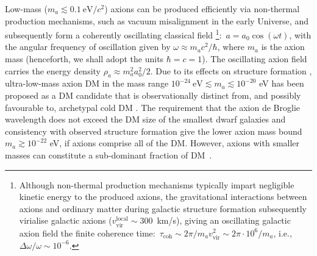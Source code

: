 Low-mass ($m_a \lesssim 0.1~\textrm{eV}/c^2$) axions can be produced efficiently via non-thermal production mechanisms, such as vacuum misalignment \cite{Preskill1983cosmo,Sikivie1983cosmo,Dine1983cosmo} in the early Universe, and subsequently form a coherently oscillating classical field \footnote{Although non-thermal production mechanisms typically impart negligible kinetic energy to the produced axions, the gravitational interactions between axions and ordinary matter during galactic structure formation subsequently virialise galactic axions ($v_{\textrm{vir}}^{\textrm{local}} \sim 300$~km/s), giving an oscillating galactic axion field the finite coherence time:~$\tau_{\textrm{coh}} \sim 2\pi / m_a v_{\textrm{vir}}^2 \sim 2\pi \cdot 10^6 / m_a $, i.e., $\Delta \omega / \omega \sim 10^{-6}$. }:~$a = a_0 \cos(\omega t)$, with the angular frequency of oscillation given by $\omega \approx m_a c^2 / \hbar$, where $m_a$ is the axion mass (henceforth, we shall adopt the units $\hbar = c = 1$).
The oscillating axion field carries the energy density $\rho_a \approx m_a^2 a_0^2 /2$. Due to its effects on structure formation \cite{Khlopov1985}, ultra-low-mass axion DM in the mass range $10^{-24}~\textrm{eV} \lesssim m_a \lesssim 10^{-20}$ eV has been proposed as a DM candidate that is observationally distinct from, and possibly favourable to, archetypal cold DM \cite{Hu2000,Marsh2014,Schive2014,Marsh2015Review,Hui2017}.
The requirement that the axion de Broglie wavelength does not exceed the DM size of the smallest dwarf galaxies and consistency with observed structure formation \cite{Marsh2015B,Schive2015,Marsh2017} give the lower axion mass bound $m_a \gtrsim 10^{-22}$ eV, if axions comprise all of the DM. However, axions with smaller masses can constitute a sub-dominant fraction of DM~\cite{Hlozek15}.

